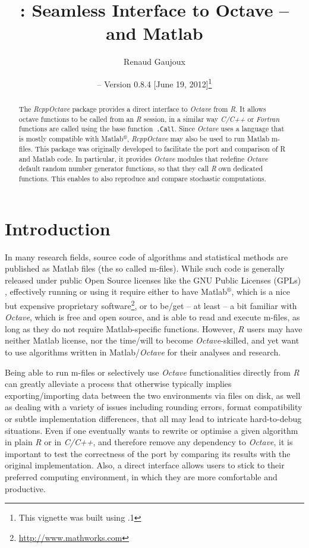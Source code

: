 \documentclass[english,10pt,a4paper]{article}\usepackage{graphicx, color}
\author{Renaud Gaujoux}
\title{\pkgname{RcppOctave}: Seamless Interface to Octave -- and Matlab}
\date{\Rpkg{RcppOctave} -- Version 0.8.4
[June 19, 2012]\footnote{This vignette was built using \octave
3.6.1}}
\newcommand{\matlab}{Matlab$^\circledR$\xspace}
\let\proglang=\textit
\let\code=\texttt
\newcommand{\pkgname}[1]{\textit{#1}\xspace}
\newcommand{\Rpkg}[1]{\pkgname{#1} package\xspace}
\newcommand{\R}{\proglang{R}\xspace}
\newcommand{\octave}{\proglang{Octave}\xspace}
\begin{document}
\maketitle

\begin{abstract}
The \Rpkg{RcppOctave} provides a direct interface to \octave from
\R.
It allows \\octave functions to be called from an \R session,
in a similar way \proglang{C/C++} or \proglang{Fortran} functions are called using the base function~\code{.Call}.
Since \octave uses a language that is mostly compatible with \matlab,
\pkgname{RcppOctave} may also be used to run Matlab m-files.
This package was originally developed to facilitate the port and comparison of R
and Matlab code.
In particular, it provides \octave modules that redefine
\octave default random number generator functions, so that they call
\proglang{R} own dedicated functions.
This enables to also reproduce and compare stochastic computations.
\end{abstract}

\noindent\hrulefill
\tableofcontents
\noindent\hrulefill

\section{Introduction}

In many research fields, source code of algorithms and statistical methods are
published as Matlab files (the so called m-files).
While such code is generally released under public Open Source licenses like the
GNU Public Licenses (GPLs) \cite{gnuGPL}, effectively running or using it
require either to have \matlab, which is a nice but expensive proprietary
software\footnote{\url{http://www.mathworks.com}}, or to be/get -- at least -- a bit familiar with \octave \cite{Eaton2002}, which is free and open source, and is able to read and execute m-files, as long as they do not require Matlab-specific functions.
However, \proglang{R} users may have neither Matlab license, nor the
time/will to become \octave-skilled, and yet want to use algorithms written in
Matlab/\octave for their analyses and research.

Being able to run m-files or selectively use \octave functionalities
directly from \proglang{R} can greatly alleviate a process that otherwise
typically implies exporting/importing data between the two environments via
files on disk, as well as dealing with a variety of issues including
rounding errors, format compatibility or subtle implementation differences,
that all may lead to intricate hard-to-debug situations.
Even if one eventually wants to rewrite or optimise a given algorithm in plain
\proglang{R} or in \proglang{C/C++}, and therefore remove any dependency to
\octave, it is important to test the correctness of the port by
comparing its results with the original implementation.
Also, a direct interface allows users to stick to their preferred computing
environment, in which they are more comfortable and productive.
\end{document}
